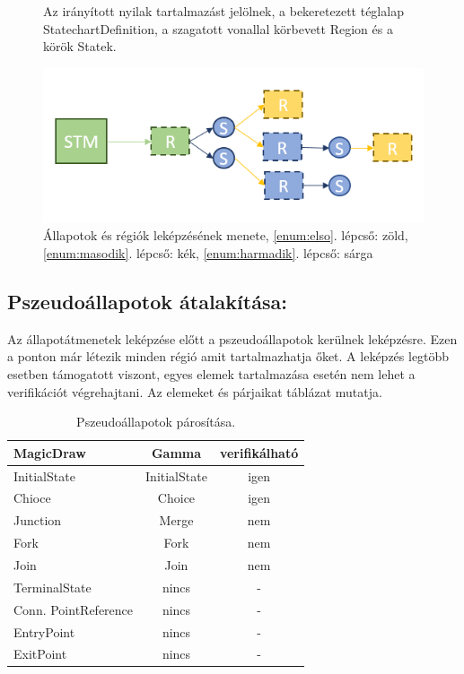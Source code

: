 \begin{figure}[H]
Az irányított nyilak tartalmazást jelölnek, a bekeretezett téglalap StatechartDefinition, a szagatott vonallal körbevett Region és a körök Statek.

\centering
\includegraphics[keepaspectratio, width=140mm]{figures/transformation.png}
\caption{Állapotok és régiók leképzésének menete, \ref{enum:elso}. lépcső: zöld, \ref{enum:masodik}. lépcső: kék, \ref{enum:harmadik}. lépcső: sárga}
\label{fig:state-transformation}
\end{figure}


\subsection{Pszeudoállapotok átalakítása:}
Az állapotátmenetek leképzése előtt a pszeudoállapotok kerülnek leképzésre. Ezen a ponton már létezik minden régió amit tartalmazhatja őket. A leképzés legtöbb esetben támogatott viszont, egyes elemek tartalmazása esetén nem lehet a verifikációt végrehajtani. Az elemeket és párjaikat  táblázat mutatja.

\begin{table}[!h]
	\footnotesize
	\centering
	\begin{tabular}{ l c c }
		MagicDraw & Gamma & verifikálható \\ \hline
		InitialState & InitialState & igen \\
		Chioce & Choice & igen \\
		Junction & Merge & nem \\
		Fork & Fork & nem \\
		Join & Join & nem \\
		TerminalState & nincs & - \\
		Conn. PointReference & nincs & - \\
		EntryPoint & nincs & - \\
		ExitPoint & nincs & -
		
	\end{tabular}
	\caption{Pszeudoállapotok párosítása.}
	\label{table:pseudo}
\end{table}

